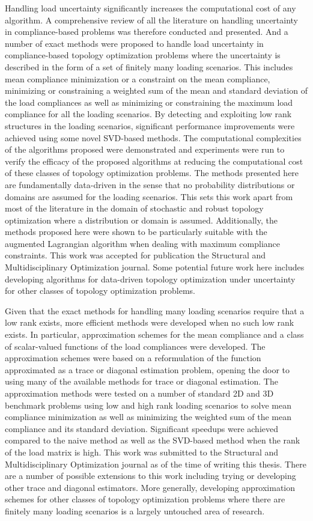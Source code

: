 Handling load uncertainty significantly increases the computational cost of any algorithm. A comprehensive review of all the literature on handling uncertainty in compliance-based problems was therefore conducted and presented. And a number of exact methods were proposed to handle load uncertainty in compliance-based topology optimization problems where the uncertainty is described in the form of a set of finitely many loading scenarios. This includes mean compliance minimization or a constraint on the mean compliance, minimizing or constraining a weighted sum of the mean and standard deviation of the load compliances as well as minimizing or constraining the maximum load compliance for all the loading scenarios. By detecting and exploiting low rank structures in the loading scenarios, significant performance improvements were achieved using some novel SVD-based methods. The computational complexities of the algorithms proposed were demonstrated and experiments were run to verify the efficacy of the proposed algorithms at reducing the computational cost of these classes of topology optimization problems. The methods presented here are fundamentally data-driven in the sense that no probability distributions or domains are assumed for the loading scenarios. This sets this work apart from most of the literature in the domain of stochastic and robust topology optimization where a distribution or domain is assumed. Additionally, the methods proposed here were shown to be particularly suitable with the augmented Lagrangian algorithm when dealing with maximum compliance constraints. This work was accepted for publication the Structural and Multidisciplinary Optimization journal. Some potential future work here includes developing algorithms for data-driven topology optimization under uncertainty for other classes of topology optimization problems.

Given that the exact methods for handling many loading scenarios require that a low rank exists, more efficient methods were developed when no such low rank exists. In particular, approximation schemes for the mean compliance and a class of scalar-valued functions of the load compliances were developed. The approximation schemes were based on a reformulation of the function approximated as a trace or diagonal estimation problem, opening the door to using many of the available methods for trace or diagonal estimation. The approximation methods were tested on a number of standard 2D and 3D benchmark problems using low and high rank loading scenarios to solve mean compliance minimization as well as minimizing the weighted sum of the mean compliance and its standard deviation. Significant speedups were achieved compared to the naive method as well as the SVD-based method when the rank of the load matrix is high. This work was submitted to the Structural and Multidisciplinary Optimization journal as of the time of writing this thesis. There are a number of possible extensions to this work including trying or developing other trace and diagonal estimators. More generally, developing approximation schemes for other classes of topology optimization problems where there are finitely many loading scenarios is a largely untouched area of research.

